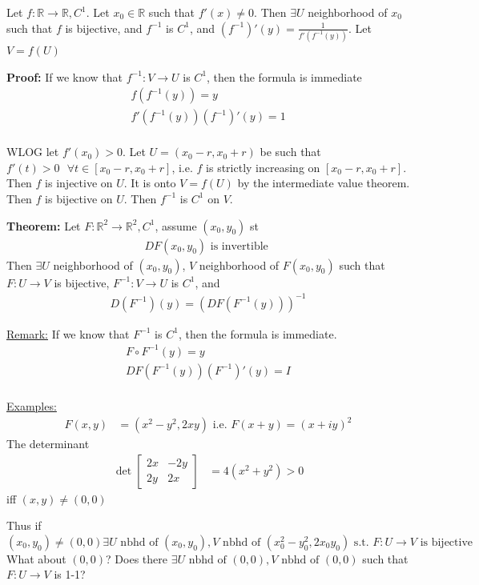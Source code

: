 \documentclass{article}
\newcommand*{\txt}[1]{\text{ #1 }}%
\newcommand*{\fora}{\txt{}\forall}%
\newcommand*{\rr}{\mathbb{R}}%
\begin{document}
Let $f:\rr\to\rr, C^1$. Let $x_0\in \rr$ such that $f'(x)\neq 0$. Then $\exists U$ neighborhood of $x_0$ such that $f$ is bijective, and $f^{-1}$ is $C^1$, and $(f^{-1})'(y)=\frac{1}{f'(f^{-1}(y))}$. Let $V=f(U)$

\textbf{Proof:} If we know that $f^{-1}: V\to U$ is $C^1$, then the formula is immediate \begin{align*}
    f(f^{-1}(y))=y\\
    f'(f^{-1}(y))(f^{-1})'(y)=1\\
\end{align*}

WLOG let $f'(x_0)>0$. Let $U=(x_0-r,x_0+r)$ be such that $f'(t)>0\fora t\in [x_0-r,x_0+r]$, i.e. $f$ is strictly increasing on $[x_0-r,x_0+r]$. Then $f$ is injective on $U$. It is onto $V=f(U)$ by the intermediate value theorem. Then $f$ is bijective on $U$. Then $f^{-1}$ is $C^1$ on $V$. 

\textbf{Theorem:} Let $F:\rr^2\to \rr^2, C^1$, assume $(x_0,y_0)$ st \begin{align*}
    DF(x_0,y_0)\txt{is invertible}
\end{align*} Then $\exists U$ neighborhood of $(x_0,y_0)$, $V$ neighborhood of $F(x_0,y_0)$ such that $F:U\to V$ is bijective, $F^{-1}:V\to U$ is $C^1$, and \begin{align*}
    D(F^{-1})(y)=(DF(F^{-1}(y)))^{-1}
\end{align*}

\underline{Remark:} If we know that $F^{-1}$ is $C^1$, then the formula is immediate.\begin{align*}
    F\circ F^{-1}(y)=y\\
    DF(F^{-1}(y))(F^{-1})'(y)=I\\
\end{align*}

\underline{Examples:} \begin{align*}
    F(x,y)&=(x^2-y^2,2xy)\txt{i.e.}F(x+y)=(x+iy)^2
\end{align*}The determinant \begin{align*}
    \det\begin{bmatrix}
        2x & -2y\\
        2y & 2x
    \end{bmatrix}&=4(x^2+y^2)>0
\end{align*} iff $(x,y)\neq (0,0)$

Thus if $(x_0,y_0)\neq (0,0)\exists U\txt{nbhd of}(x_0,y_0),V\txt{nbhd of}(x_0^2-y_0^2,2x_0y_0)\txt{s.t.}F:U\to V\txt{is bijective}$ What about $(0,0)$? Does there $\exists U \txt{nbhd of }(0,0), V\txt{nbhd of }(0,0)$ such that $F:U\to V$ is 1-1?
\end{document}
